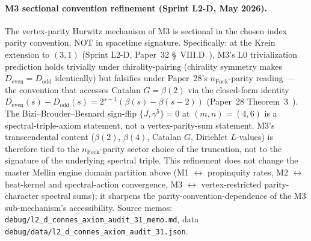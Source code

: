 \documentclass[aps,pra,twocolumn,superscriptaddress,longbibliography]{revtex4-2}
\begin{document}
\paragraph{M3 sectional convention refinement (Sprint L2-D, May 2026).}
The vertex-parity Hurwitz mechanism of M3 is sectional in the chosen
index parity convention, NOT in spacetime signature.  Specifically:
at the Krein extension to $(3, 1)$ (Sprint L2-D, Paper~32
\S~VIII.D~\cite{loutey_paper32}), M3's L0
trivialization prediction holds trivially under chirality-pairing
(chirality symmetry makes $D_{\mathrm{even}} = D_{\mathrm{odd}}$
identically) but falsifies under Paper~28's
$n_{\mathrm{Fock}}$-parity reading --- the convention that accesses
Catalan $G = \beta(2)$ via the closed-form identity
$D_{\mathrm{even}}(s) - D_{\mathrm{odd}}(s) = 2^{s-1}(\beta(s) -
\beta(s-2))$ (Paper~28 Theorem~3~\cite{loutey_paper28}).  The
Bizi--Brouder--Besnard sign-flip $\{J, \gamma^5\} = 0$ at
$(m, n) = (4, 6)$ is a spectral-triple-axiom statement, not a
vertex-parity-sum statement.  M3's transcendental content
($\beta(2)$, $\beta(4)$, Catalan $G$, Dirichlet $L$-values) is
therefore tied to the $n_{\mathrm{Fock}}$-parity sector choice of
the truncation, not to the signature of the underlying spectral
triple.  This refinement does not change the master Mellin engine
domain partition above (M1 $\leftrightarrow$ propinquity rates,
M2 $\leftrightarrow$ heat-kernel and spectral-action convergence,
M3 $\leftrightarrow$ vertex-restricted parity-character spectral
sums); it sharpens the parity-convention-dependence of the M3
sub-mechanism's accessibility.  Source memos:
\texttt{debug/l2\_d\_connes\_axiom\_audit\_31\_memo.md},
data \texttt{debug/data/l2\_d\_connes\_axiom\_audit\_31.json}.
\end{document}
